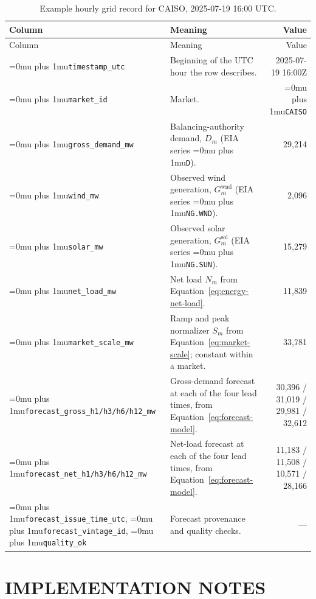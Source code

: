 \documentclass{UNCC-thesis}
\newcommand{\codepath}[1]{{\Urlmuskip=0mu plus 1mu\relax\nolinkurl{#1}}}
\begin{document}
\begingroup
\small
\singlespacing
\begin{longtable}{@{}L{0.23\textwidth}L{0.36\textwidth}r@{}}
\caption{Example hourly grid record for CAISO, 2025-07-19 16:00 UTC.}
  \label{tab:panel-columns}\\
    \toprule
    Column & Meaning & Value \\
    \midrule
  \endfirsthead
    \toprule
    Column & Meaning & Value \\
    \midrule
  \endhead
    \codepath{timestamp_utc}
      & Beginning of the UTC hour the row describes.
      & 2025-07-19 16:00Z \\
    \codepath{market_id}
      & Market.
      & \codepath{CAISO} \\
    \addlinespace
    \codepath{gross_demand_mw}
      & Balancing-authority demand, \(D_m\) (EIA series \codepath{D}).
      & 29,214 \\
    \codepath{wind_mw}
      & Observed wind generation, \(G^{\mathrm{wnd}}_m\) (EIA series
        \codepath{NG.WND}).
      & 2,096 \\
    \codepath{solar_mw}
      & Observed solar generation, \(G^{\mathrm{sol}}_m\) (EIA series
        \codepath{NG.SUN}).
      & 15,279 \\
    \codepath{net_load_mw}
      & Net load \(N_m\) from Equation~\eqref{eq:energy-net-load}.
      & 11,839 \\
    \addlinespace
    \codepath{market_scale_mw}
      & Ramp and peak normalizer \(S_m\) from Equation~\eqref{eq:market-scale};
        constant within a market.
      & 33,781 \\
    \addlinespace
    \codepath{forecast_gross_h1/h3/h6/h12_mw}
      & Gross-demand forecast at each of the four lead times, from
        Equation~\eqref{eq:forecast-model}.
      & 30,396 / 31,019 / 29,981 / 32,612 \\
    \codepath{forecast_net_h1/h3/h6/h12_mw}
      & Net-load forecast at each of the four lead times, from
        Equation~\eqref{eq:forecast-model}.
      & 11,183 / 11,508 / 10,571 / 28,166 \\
    \codepath{forecast_issue_time_utc},
    \codepath{forecast_vintage_id},
    \codepath{quality_ok}
      & Forecast provenance and quality checks.
      & --- \\
    \bottomrule
\end{longtable}
\endgroup

\chapter{IMPLEMENTATION NOTES}
\label{app:implementation}
\raggedright
\setlength{\parindent}{.17in}
\end{document}
